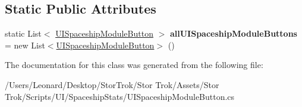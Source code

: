\subsection*{Static Public Attributes}
\begin{DoxyCompactItemize}
\item 
\mbox{\label{class_u_i_spaceship_module_button_a5b975c3416cbc2159cdcb2f023beb542}} 
static List$<$ \hyperlink{class_u_i_spaceship_module_button}{U\+I\+Spaceship\+Module\+Button} $>$ {\bfseries all\+U\+I\+Spaceship\+Module\+Buttons} = new List$<$\hyperlink{class_u_i_spaceship_module_button}{U\+I\+Spaceship\+Module\+Button}$>$ ()
\end{DoxyCompactItemize}


The documentation for this class was generated from the following file\+:\begin{DoxyCompactItemize}
\item 
/\+Users/\+Leonard/\+Desktop/\+Stor\+Trok/\+Stor Trok/\+Assets/\+Stor Trok/\+Scripts/\+U\+I/\+Spaceship\+Stats/U\+I\+Spaceship\+Module\+Button.\+cs\end{DoxyCompactItemize}
